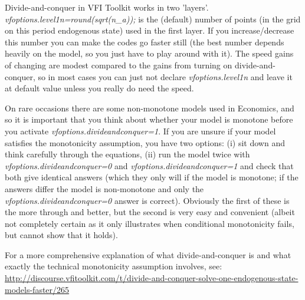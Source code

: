 Divide-and-conquer in VFI Toolkit works in two 'layers'. \textit{vfoptions.level1n=round(sqrt(n\_{}a));} is the (default) number of points (in the grid on this period endogenous state) used in the first layer. If you increase/decrease this number you can make the codes go faster still (the best number depends heavily on the model, so you just have to play around with it). The speed gains of changing are modest compared to the gains from turning on divide-and-conquer, so in most cases you can just not declare \textit{vfoptions.level1n} and leave it at default value unless you really do need the speed.

 On rare occasions there are some non-monotone models used in Economics, and so it is important that you think about whether your model is monotone before you activate \textit{vfoptions.divideandconquer=1}. If you are unsure if your model satisfies the monotonicity assumption, you have two options: (i) sit down and think carefully through the equations, (ii) run the model twice with \textit{vfoptions.divideandconquer=0} and \textit{vfoptions.divideandconquer=1} and check that both give identical answers (which they only will if the model is monotone; if the answers differ the model is non-monotone and only the \textit{vfoptions.divideandconquer=0} answer is correct). Obviously the first of these is the more through and better, but the second is very easy and convenient (albeit not completely certain as it only illustrates when conditional monotonicity fails, but cannot show that it holds).

For a more comprehensive explanation of what divide-and-conquer is and what exactly the technical monotonicity assumption involves, see:
\href{http://discourse.vfitoolkit.com/t/divide-and-conquer-solve-one-endogenous-state-models-faster/265}{http://discourse.vfitoolkit.com/t/divide-and-conquer-solve-one-endogenous-state-models-faster/265}


